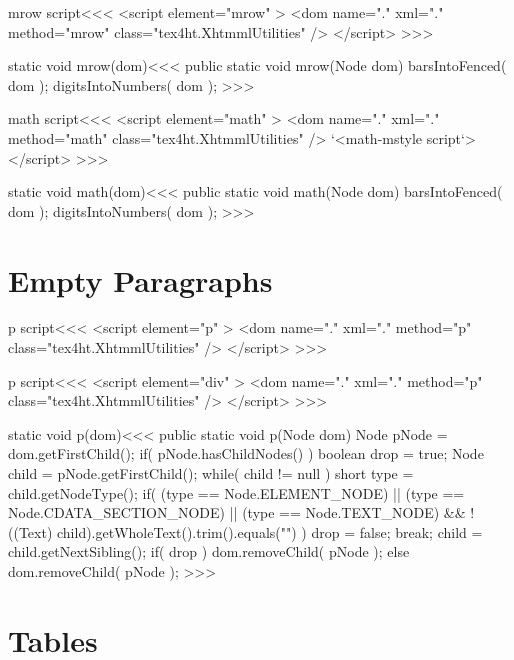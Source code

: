 \documentclass{article}
\begin{document}
\<mrow script\><<<
<script element="mrow" >
   <dom name="." xml="." method="mrow" class="tex4ht.XhtmmlUtilities" />
</script> 
>>>




\<static void mrow(dom)\><<<
public static void mrow(Node dom) {
   barsIntoFenced( dom );
   digitsIntoNumbers( dom );
}
>>>


\<math script\><<<
<script element="math" >
   <dom name="." xml="." method="math" class="tex4ht.XhtmmlUtilities" />
   `<math-mstyle script`>
</script> 
>>>




\<static void math(dom)\><<<
public static void math(Node dom) {
   barsIntoFenced( dom );
   digitsIntoNumbers( dom );
}
>>>












\section{Empty Paragraphs}

\<p script\><<<
<script element="p" >
   <dom name="." xml="." method="p" class="tex4ht.XhtmmlUtilities" />
</script> 
>>>

\<p script\><<<
<script element="div" >
   <dom name="." xml="." method="p" class="tex4ht.XhtmmlUtilities" />
</script> 
>>>


\<static void p(dom)\><<<
public static void p(Node dom) {
   Node pNode = dom.getFirstChild();
   if( pNode.hasChildNodes() ){
      boolean drop = true;
      Node child = pNode.getFirstChild();
      while( child != null ){
         short type = child.getNodeType();
         if(              
             (type == Node.ELEMENT_NODE)
           ||             
             (type == Node.CDATA_SECTION_NODE)
           ||             
             (type == Node.TEXT_NODE)
           &&
             !((Text) child).getWholeText().trim().equals("")  
         ){         
            drop = false; break;
         }
         child = child.getNextSibling();
      }
      if( drop ){
         dom.removeChild( pNode );
      }        
   } else {
      dom.removeChild( pNode );
   }
}
>>>



\section{Tables}
\end{document}

